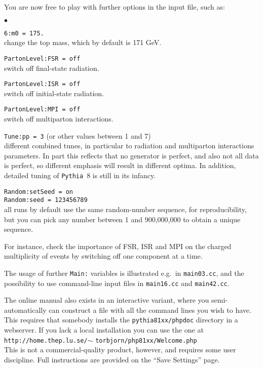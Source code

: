 \documentclass[12pt,a4paper]{article}
\newenvironment{Itemize}{\begin{list}{$\bullet$}%
{\setlength{\topsep}{0.4mm}\setlength{\partopsep}{0.4mm}%
\setlength{\itemsep}{0.4mm}\setlength{\parsep}{0.4mm}}}%
{\end{list}}
\begin{document}
You are now free to play with further options in the input file, such as:
\begin{Itemize}
\item \texttt{6:m0 = 175.}\\  
change the top mass, which by default is 171 GeV.
\item \texttt{PartonLevel:FSR = off}\\  
switch off final-state radiation.
\item \texttt{PartonLevel:ISR = off}\\  
switch off initial-state radiation.
\item \texttt{PartonLevel:MPI = off}\\
switch off multiparton interactions.  
\item \texttt{Tune:pp = 3} (or other values between 1 and 7) \\
different combined tunes, in particular to radiation and multiparton 
interactions parameters. In part this reflects that no generator 
is perfect, and also not all data is perfect, so different emphasis 
will result in different optima. In addition, detailed tuning of 
\texttt{Pythia}~8 is still in its infancy.  
\item \texttt{Random:setSeed = on}\\
\texttt{Random:seed = 123456789}\\
all runs by default use the same random-number sequence, for reproducibility,
but you can pick any number between 1 and 900,000,000 to obtain a unique
sequence.
\end{Itemize}
For instance, check the importance of FSR, ISR and MPI on the charged 
multiplicity of events by switching off one component at a time.

The usage of further \texttt{Main:} variables is illustrated e.g.\ in
\texttt{main03.cc}, and the possibility to use command-line input
files in \texttt{main16.cc} and \texttt{main42.cc}. 

The online manual also exists in an interactive variant, where you
semi-automatically can construct a file with all the command lines you
wish to have. This requires that somebody installs the 
\texttt{pythia81xx/phpdoc} directory in a webserver. If you lack a local
installation you can use the one at\\
\hspace*{10mm}\texttt{http://home.thep.lu.se/}$\sim$%
\texttt{torbjorn/php81xx/Welcome.php}\\
This is not a commercial-quality product, however, and requires some
user discipline. Full instructions are provided on the ``Save Settings''
page.
\end{document}
